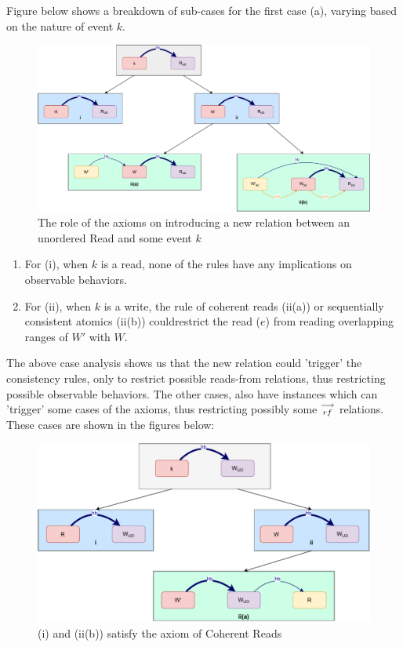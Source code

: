     Figure below shows a breakdown of sub-cases for the first case (a), varying based
    on the nature of event $k$.
    \begin{figure}[H]
        \centering
        \includegraphics[scale=0.6]{InstructionReordering/ValidReorderingProof/ProofParts/Part4/part4(a).pdf}
        \caption{The role of the axioms on introducing a new relation between an unordered Read and some event $k$}
        \label{fig:my_label}
    \end{figure}
    
    \begin{enumerate}
        \item For (i), when $k$ is a read, none of the rules have any implications on observable behaviors.
        \item For (ii), when $k$ is a write, the rule of coherent reads (ii(a)) or sequentially consistent atomics (ii(b)) couldrestrict the read ($e$) from reading overlapping ranges of $W'$ with $W$.
    \end{enumerate}
    
    The above case analysis shows us that the new relation could 'trigger' the consistency rules, only to restrict possible reads-from relations, thus restricting possible observable behaviors. 
    The other cases, also have instances which can 'trigger' some cases of the axioms, thus restricting possibly some $\stackrel{\longrightarrow}{_{rf}}$ relations. These cases are shown in the figures below: 
    \begin{figure}[H]
        \centering
        \includegraphics[scale=0.6]{InstructionReordering/ValidReorderingProof/ProofParts/Part4/part4(b).pdf}
        \caption{(i) and (ii(b)) satisfy the axiom of Coherent Reads}
        \label{fig:my_label}
    \end{figure}
          
